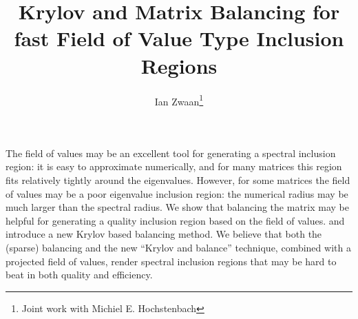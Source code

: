 \documentclass{article}
\title{Krylov and Matrix Balancing for fast Field of Value Type Inclusion Regions}
\author{Ian Zwaan\thanks{Joint work with Michiel E. Hochstenbach}}
\affil{PhD student at TU/e}
\date{}
\begin{document}
\maketitle
\setcounter{page}{6}
\vspace{-1cm}
The field of values may be an excellent tool for generating a spectral
inclusion region: it is easy to approximate numerically, and for many
matrices this region fits relatively tightly around the eigenvalues.
However, for some matrices the field of values may be a poor eigenvalue
inclusion region: the numerical radius may be much larger than the
spectral radius. We show that balancing the matrix may be helpful for
generating a quality inclusion region based on the field of values. and
introduce a new Krylov based balancing method. We believe that both the
(sparse) balancing and the new ``Krylov and balance'' technique,
combined with a projected field of values, render spectral inclusion
regions that may be hard to beat in both quality and efficiency.
\end{document}
